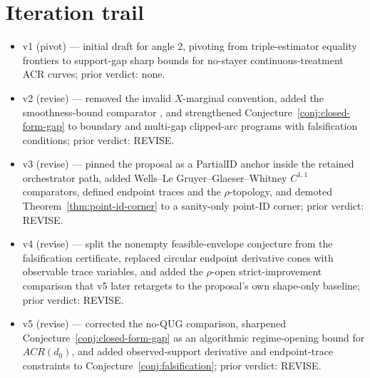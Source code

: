 \documentclass[11pt]{article}
\theoremstyle{definition}
\theoremstyle{plain}
\theoremstyle{remark}
\begin{document}
\section{Iteration trail}
\begin{itemize}[leftmargin=*]
\item v1 (pivot) --- initial draft for angle 2, pivoting from triple-estimator equality frontiers to support-gap sharp bounds for no-stayer continuous-treatment ACR curves; prior verdict: none.
\item v2 (revise) --- removed the invalid \(X\)-marginal convention, added the smoothness-bound comparator \citet{KimKwonKwonLee2018}, and strengthened Conjecture~\ref{conj:closed-form-gap} to boundary and multi-gap clipped-arc programs with falsification conditions; prior verdict: REVISE.
\item v3 (revise) --- pinned the proposal as a PartialID anchor inside the retained orchestrator path, added Wells--Le Gruyer--Glaeser--Whitney \(C^{1,1}\) comparators, defined endpoint traces and the \(\rho\)-topology, and demoted Theorem~\ref{thm:point-id-corner} to a sanity-only point-ID corner; prior verdict: REVISE.
\item v4 (revise) --- split the nonempty feasible-envelope conjecture from the falsification certificate, replaced circular endpoint derivative cones with observable trace variables, and added the \(\rho\)-open strict-improvement comparison that v5 later retargets to the proposal's own shape-only baseline; prior verdict: REVISE.
\item v5 (revise) --- corrected the \citet{DCDHK2026NoUntreated} no-QUG comparison, sharpened Conjecture~\ref{conj:closed-form-gap} as an algorithmic regime-opening bound for \(ACR(d_0)\), and added observed-support derivative and endpoint-trace constraints to Conjecture~\ref{conj:falsification}; prior verdict: REVISE.
\end{itemize}
\end{document}
